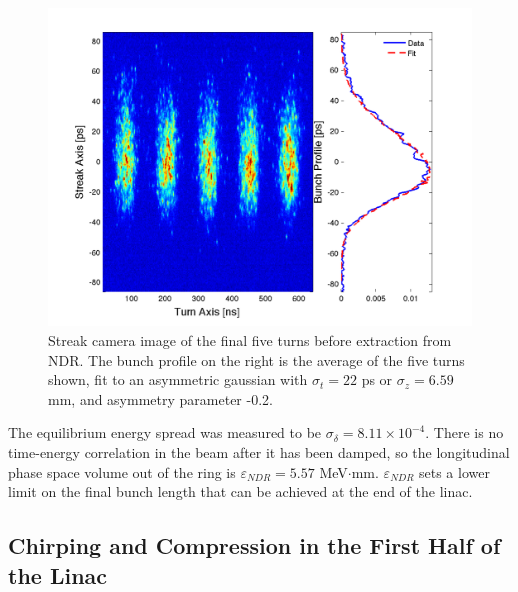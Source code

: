 \documentclass[%
twocolumn,
showpacs,preprintnumbers,
 aps,
prstab,
]{revtex4-1}
\begin{document}
\begin{figure}[htb]
  \includegraphics[width=\columnwidth]{figures/combo.pdf}
  \caption{Streak camera image of the final five turns before extraction from NDR. The bunch profile on the right is the average of the five turns shown, fit to an asymmetric gaussian with $\sigma_t = 22$ ps or $\sigma_z = 6.59$ mm, and asymmetry parameter -0.2.}
  \label{streak}
\end{figure}

The equilibrium energy spread was measured to be $\sigma_{\delta} = 8.11 \times 10^{-4}$. There is no time-energy correlation in the beam after it has been damped, so the longitudinal phase space volume out of the ring is $\varepsilon_{NDR} = 5.57$ MeV$\cdot$mm. $\varepsilon_{NDR}$ sets a lower limit on the final bunch length that can be achieved at the end of the linac.

\subsection{Chirping and Compression in the First Half of the Linac}
\end{document}
